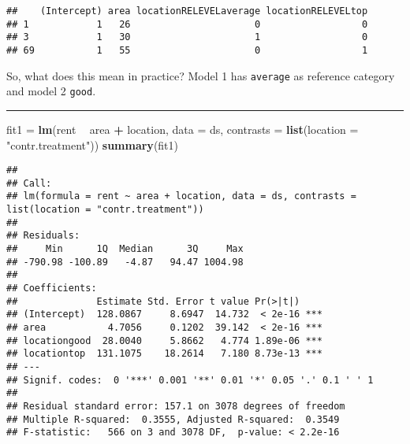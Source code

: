 \documentclass[]{article}
\newenvironment{Shaded}{\begin{snugshade}}{\end{snugshade}}
\newcommand{\DataTypeTok}[1]{\textcolor[rgb]{0.13,0.29,0.53}{#1}}
\newcommand{\DecValTok}[1]{\textcolor[rgb]{0.00,0.00,0.81}{#1}}
\newcommand{\KeywordTok}[1]{\textcolor[rgb]{0.13,0.29,0.53}{\textbf{#1}}}
\newcommand{\NormalTok}[1]{#1}
\newcommand{\OperatorTok}[1]{\textcolor[rgb]{0.81,0.36,0.00}{\textbf{#1}}}
\newcommand{\StringTok}[1]{\textcolor[rgb]{0.31,0.60,0.02}{#1}}
\begin{document}
\begin{Shaded}
\end{Shaded}

\begin{verbatim}
##    (Intercept) area locationRELEVELaverage locationRELEVELtop
## 1            1   26                      0                  0
## 3            1   30                      1                  0
## 69           1   55                      0                  1
\end{verbatim}

So, what does this mean in practice? Model 1 has \texttt{average} as
reference category and model 2 \texttt{good}.

\begin{center}\rule{0.5\linewidth}{\linethickness}\end{center}

\begin{Shaded}
\begin{Highlighting}[]
\NormalTok{fit1 =}\StringTok{ }\KeywordTok{lm}\NormalTok{(rent }\OperatorTok{~}\StringTok{ }\NormalTok{area }\OperatorTok{+}\StringTok{ }\NormalTok{location, }\DataTypeTok{data =}\NormalTok{ ds, }\DataTypeTok{contrasts =} \KeywordTok{list}\NormalTok{(}\DataTypeTok{location =} \StringTok{"contr.treatment"}\NormalTok{))}
\KeywordTok{summary}\NormalTok{(fit1)}
\end{Highlighting}
\end{Shaded}

\begin{verbatim}
## 
## Call:
## lm(formula = rent ~ area + location, data = ds, contrasts = list(location = "contr.treatment"))
## 
## Residuals:
##     Min      1Q  Median      3Q     Max 
## -790.98 -100.89   -4.87   94.47 1004.98 
## 
## Coefficients:
##              Estimate Std. Error t value Pr(>|t|)    
## (Intercept)  128.0867     8.6947  14.732  < 2e-16 ***
## area           4.7056     0.1202  39.142  < 2e-16 ***
## locationgood  28.0040     5.8662   4.774 1.89e-06 ***
## locationtop  131.1075    18.2614   7.180 8.73e-13 ***
## ---
## Signif. codes:  0 '***' 0.001 '**' 0.01 '*' 0.05 '.' 0.1 ' ' 1
## 
## Residual standard error: 157.1 on 3078 degrees of freedom
## Multiple R-squared:  0.3555, Adjusted R-squared:  0.3549 
## F-statistic:   566 on 3 and 3078 DF,  p-value: < 2.2e-16
\end{verbatim}
\end{document}
